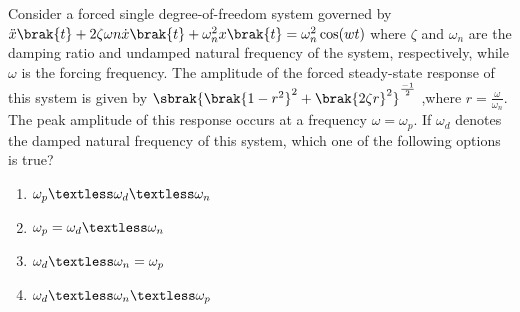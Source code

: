 \item{
Consider a forced single degree-of-freedom system governed by
$\ddot{x}\brak{t}+2\zeta\omega n\dot{x}\brak{t}+\omega_n^2x\brak{t}=\omega_n^2 \cos(wt)$
where $\zeta$ and $\omega_n$ are the damping ratio and undamped natural frequency of the system, respectively, while $\omega$ is the forcing frequency. The amplitude of the forced steady-state response of this system is given by $\sbrak{\brak{1-r^2}^2+\brak{2\zeta r}^2}^{\frac{-1}{2}}$ ,where 
$r=\frac{\omega}{\omega_n}$. The peak amplitude of this response occurs at a frequency $\omega=\omega_p$. If $\omega_d$ denotes the damped natural frequency of this system, which one of the following options is true?
\begin{multicols}{2}
    \begin{enumerate}
        \item $\omega_p\textless\omega_d\textless\omega_n$
        \item $\omega_p=\omega_d\textless\omega_n$
        \item $\omega_d\textless\omega_n=\omega_p$
        \item $\omega_d\textless\omega_n\textless\omega_p$
    \end{enumerate}
\end{multicols}
}
